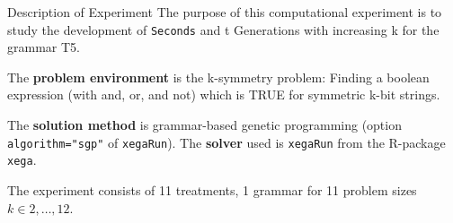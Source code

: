 \begin{frame}
\vspace*{2mm}
\begin{block}{
Description of Experiment
}
The purpose of this computational experiment is to study
the development of {\tt Seconds} and {	t Generations} with increasing k
for the grammar T5.
 
The {\bf problem environment} is the k-symmetry problem: 
Finding a boolean expression (with and, or, and not)
which is TRUE for symmetric k-bit strings.
 
The {\bf solution method} is grammar-based genetic programming
(option {\tt algorithm="sgp"}  of {\tt xegaRun}).
The {\bf solver} used is {\tt xegaRun} from the R-package {\tt xega}.
 
The experiment consists of 11 treatments, 1 grammar for 11 problem sizes $k\in 2,\dots, 12$.
\end{block}
\end{frame}